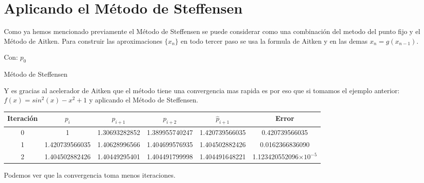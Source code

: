 \documentclass[10pt,letterpaper]{book}
\begin{document}
\section*{Aplicando el Método de Steffensen}
Como ya hemos mencionado previamente el Método de Steffensen se puede considerar como una combinación del metodo del punto fijo y el Método de Aitken. Para construir las aproximaciones $\{x_n\}$ en todo tercer paso se usa la formula de Aitken y en las demas $x_n=g(x_{n-1})$.
\begin{algorithm}[H]
  Con: 
   $p_0$ \\
 \caption{Método de Steffensen}
\end{algorithm}

 Y es gracias al acelerador de Aitken que el método tiene una convergencia mas rapida es por eso que si tomamos el ejemplo anterior: $f(x)=sin^2(x)-x^2+1$ y aplicando el Método de Steffensen.
\begin{table}[h]
\begin{tabular}{|c|c|c|c|c|c|}
\hline 
Iteración & $p_i$ & $p_{i+1}$ & $p_{i+2}$ & $\widehat{p}_{i+1}$ & Error \\
\hline
0 & 1 & 1.30693282852 & 1.389955740247 & 1.420739566035 & 0.420739566035 \\
1 & 1.420739566035 &  1.40628996566 & 1.404699576935 & 1.404502882426 & 0.0162366836090 \\ 
2 & 1.404502882426 & 1.40449295401 & 1.404491799998 & 1.404491648221& 1.123420552096$\times 10^{-5}$\\
\hline 
\end{tabular} 
\end{table}
Podemos ver que la convergencia toma menos iteraciones.
\pagebreak
\end{document}
